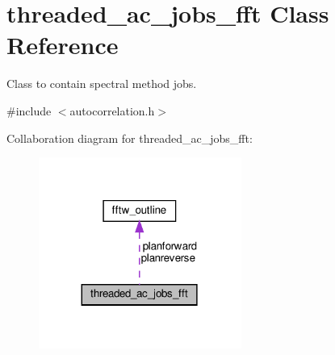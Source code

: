 \hypertarget{classthreaded__ac__jobs__fft}{}\section{threaded\+\_\+ac\+\_\+jobs\+\_\+fft Class Reference}
\label{classthreaded__ac__jobs__fft}


Class to contain spectral method jobs.  




{\ttfamily \#include $<$autocorrelation.\+h$>$}



Collaboration diagram for threaded\+\_\+ac\+\_\+jobs\+\_\+fft\+:\nopagebreak
\begin{figure}[H]
\begin{center}
\leavevmode
\includegraphics[width=188pt]{classthreaded__ac__jobs__fft__coll__graph}
\end{center}
\end{figure}
